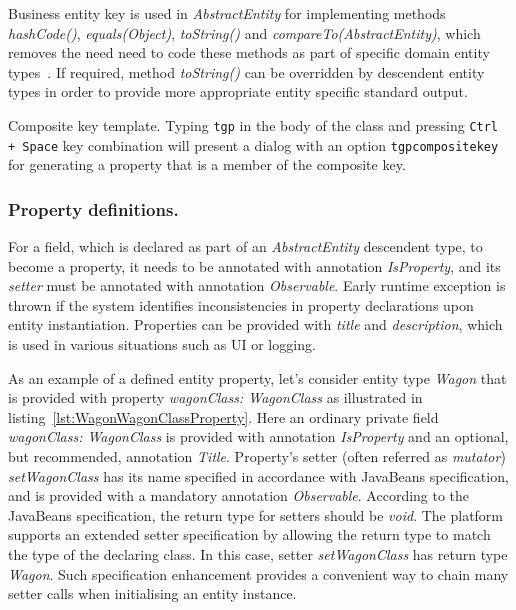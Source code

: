   Business entity key is used in \emph{AbstractEntity} for implementing methods \emph{hashCode()}, \emph{equals(Object)}, \emph{toString()} and \emph{compareTo(AbstractEntity)}, which removes the need  need to code these methods as part of specific domain entity types~\cite{Bloch2008}.
  If required, method \emph{toString()} can be overridden by descendent entity types in order to provide more appropriate entity specific standard output.

  \begin{notebox}{Composite key template.}{\label{nb:EclipseTemplatesForCompositeKey}}
    Typing \texttt{tgp} in the body of the class and pressing \texttt{Ctrl + Space} key combination will present a dialog with an option \texttt{tgpcompositekey} for generating a property that is a member of the composite key.
  \end{notebox}

  \subsubsection*{Property definitions.}
  
  For a field, which is declared as part of an \emph{AbstractEntity} descendent type, to become a property, it needs to be annotated with annotation \emph{IsProperty}, and its \emph{setter} must be annotated with annotation \emph{Observable}.
  Early runtime exception is thrown if the system identifies inconsistencies in property declarations upon entity instantiation.
  Properties can be provided with \emph{title} and \emph{description}, which is used in various situations such as UI or logging.
  
  As an example of a defined entity property, let's consider entity type \emph{Wagon} that is provided with property \emph{wagonClass: WagonClass} as illustrated in listing~\ref{lst:WagonWagonClassProperty}.
  Here an ordinary private field \emph{wagonClass: WagonClass} is provided with annotation \emph{IsProperty} and an optional, but recommended, annotation \emph{Title}.
  Property's setter (often referred as \emph{mutator}) \emph{setWagonClass} has its name specified in accordance with JavaBeans specification, and is provided with a mandatory annotation \emph{Observable}.
  According to the JavaBeans specification, the return type for setters should be \emph{void}.
  The platform supports an extended setter specification by allowing the return type to match the type of the declaring class.
  In this case, setter \emph{setWagonClass} has return type \emph{Wagon}.
  Such specification enhancement provides a convenient way to chain many setter calls when initialising an entity instance.
  
